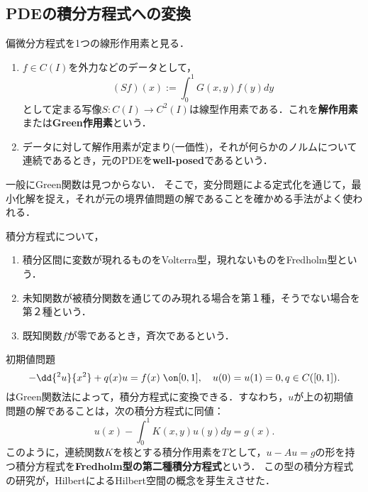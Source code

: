 \documentclass[uplatex,dvipdfmx]{jsreport}
\begin{document}
\subsection{PDEの積分方程式への変換}

\begin{tcolorbox}[colframe=ForestGreen, colback=ForestGreen!10!white,breakable,colbacktitle=ForestGreen!40!white,coltitle=black,fonttitle=\bfseries\sffamily,
title=]
    偏微分方程式を1つの線形作用素と見る．
\end{tcolorbox}

\begin{definition}\mbox{}
    \begin{enumerate}
        \item $f\in C(I)$を外力などのデータとして，
        \[(Sf)(x):=\int^1_0G(x,y)f(y)dy\]
        として定まる写像$S:C(I)\to C^2(I)$は線型作用素である．これを\textbf{解作用素}または\textbf{Green作用素}という．
        \item データに対して解作用素が定まり(一価性)，それが何らかのノルムについて連続であるとき，元のPDEを\textbf{well-posed}であるという．
    \end{enumerate}
\end{definition}
\begin{remark}
    一般にGreen関数は見つからない．
    そこで，変分問題による定式化を通じて，最小化解を捉え，それが元の境界値問題の解であることを確かめる手法がよく使われる．
\end{remark}

\begin{definition}
    積分方程式について，
    \begin{enumerate}
        \item 積分区間に変数が現れるものをVolterra型，現れないものをFredholm型という．
        \item 未知関数が被積分関数を通じてのみ現れる場合を第１種，そうでない場合を第２種という．
        \item 既知関数$f$が零であるとき，斉次であるという．
    \end{enumerate}
\end{definition}

\begin{example}
    初期値問題
    \[-\dd{^2u}{x^2}+q(x)u=f(x)\;\on[0,1],\quad u(0)=u(1)=0,q\in C([0,1]).\]
    はGreen関数法によって，積分方程式に変換できる．すなわち，$u$が上の初期値問題の解であることは，次の積分方程式に同値：
    \[u(x)-\int^1_0K(x,y)u(y)dy=g(x).\]
    このように，連続関数$K$を核とする積分作用素を$T$として，$u-Au=g$の形を持つ積分方程式を\textbf{Fredholm型の第二種積分方程式}という．
    この型の積分方程式の研究が，HilbertによるHilbert空間の概念を芽生えさせた．
\end{example}
\end{document}
